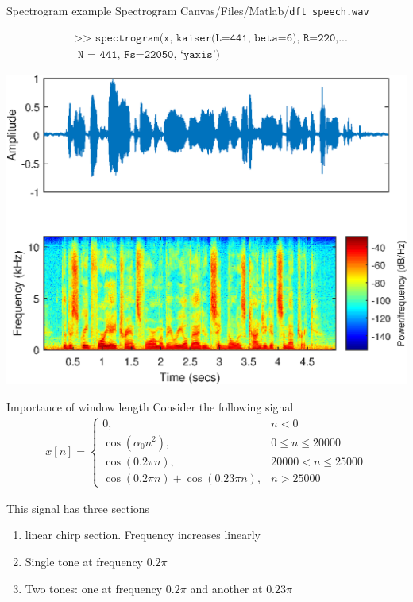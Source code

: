 \documentclass[10pt]{beamer}
\begin{document}
\begin{frame}{Spectrogram example}
	Spectrogram Canvas/Files/Matlab/\texttt{dft\_speech.wav}
	
	\begin{align*}
	&\texttt{>> spectrogram(x, kaiser(L=441, beta=6), R=220,...}\\
	&\texttt{ N = 441, Fs=22050, `yaxis')} 
	\end{align*}
	
	\begin{center}
		\includegraphics[scale=0.6]{figs/speech_spectogram_kaiser.eps}
	\end{center}
\end{frame}

\begin{frame}{Importance of window length}
Consider the following signal
\begin{align*}
	x[n] = \begin{cases}
	0, & n < 0 \\
	\cos(\alpha_0n^2), & 0 \leq n \leq 20000 \\
	\cos(0.2\pi n), & 20000 < n \leq 25000 \\
	\cos(0.2\pi n) + \cos(0.23\pi n), & n > 25000
	\end{cases}
\end{align*}

This signal has three sections
\begin{enumerate}
	\item linear chirp section. Frequency increases linearly
	\item Single tone at frequency $0.2\pi$
	\item Two tones: one at frequency $0.2\pi$ and another at $0.23\pi$
\end{enumerate}

\end{frame}
\end{document}
